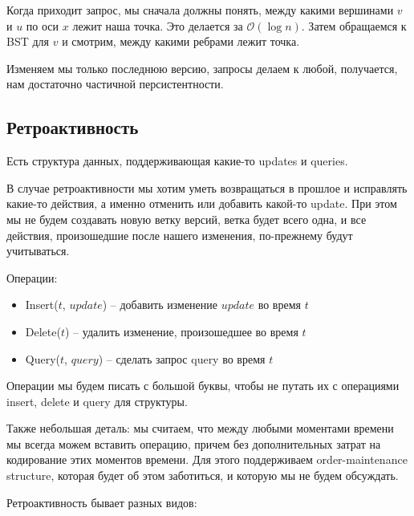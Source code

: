 Когда приходит запрос, мы сначала должны понять, между какими вершинами $v$ и $u$ по оси $x$ лежит наша точка. 
Это делается за $\mathcal{O}(\log n)$.
Затем обращаемся к BST для $v$ и смотрим, между какими ребрами лежит точка.

Изменяем мы только последнюю версию, запросы делаем к любой, получается, нам достаточно частичной персистентности.

\subsection{Ретроактивность}

Есть структура данных, поддерживающая какие-то updates и queries.

В случае ретроактивности мы хотим уметь возвращаться в прошлое и исправлять какие-то действия, а именно отменить или добавить какой-то update.
При этом мы не будем создавать новую ветку версий, ветка будет всего одна, и все действия, произошедшие после нашего изменения, по-прежнему будут учитываться.

Операции:

\begin{itemize}

\item Insert($t$, $update$) -- добавить изменение $update$ во время $t$
\item Delete($t$) -- удалить изменение, произошедшее во время $t$
\item Query($t$, $query$) -- сделать запрос query во время $t$

\end{itemize}

Операции мы будем писать с большой буквы, чтобы не путать их с операциями insert, delete и query для структуры.

Также небольшая деталь: мы считаем, что между любыми моментами времени мы всегда можем вставить операцию, причем без дополнительных затрат на кодирование этих моментов времени.
Для этого поддерживаем order-maintenance structure, которая будет об этом заботиться, и которую мы не будем обсуждать.

Ретроактивность бывает разных видов:

